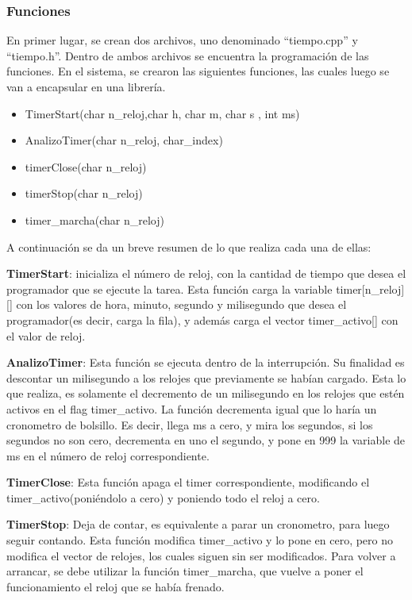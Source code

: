 \subsubsection{Funciones}

En primer lugar, se crean dos archivos, uno denominado ``tiempo.cpp''  y ``tiempo.h''. Dentro de ambos archivos se encuentra la programación de las funciones. En el sistema, se crearon las siguientes funciones, las cuales luego se van a encapsular en una librería.  

\begin{itemize}
\item TimerStart(char n\_reloj,char h, char m, char s , int ms)
\item AnalizoTimer(char n\_reloj, char\_index) 
\item timerClose(char n\_reloj) 
\item timerStop(char n\_reloj)
\item timer\_marcha(char n\_reloj) 
\end{itemize}

A continuación se da un breve resumen de lo que realiza cada una de ellas: 

\textbf{TimerStart}:  inicializa el número de reloj, con la cantidad de tiempo que desea el programador que se ejecute la tarea. Esta función carga la variable timer[n\_reloj][] con los valores de hora, minuto, segundo y milisegundo que desea el programador(es decir, carga la fila), y además carga el vector timer\_activo[] con el valor de reloj. 

\textbf{AnalizoTimer}: Esta función se ejecuta dentro de la interrupción. Su finalidad es descontar un milisegundo a los relojes que previamente se habían cargado. Esta lo que realiza, es solamente el decremento de un milisegundo en los relojes que estén activos en el flag timer\_activo. La función decrementa igual que lo haría un cronometro de bolsillo. Es decir, llega ms a cero, y mira los segundos, si los segundos no son cero, decrementa en uno el segundo, y pone en 999 la variable de ms en el número de reloj correspondiente.  

\textbf{TimerClose}: Esta función apaga el timer correspondiente, modificando el timer\_activo(poniéndolo a cero) y poniendo todo el reloj a cero. 

\textbf{TimerStop}: Deja de contar, es equivalente a parar un cronometro, para luego seguir contando. Esta función modifica timer\_activo y lo pone en cero, pero no modifica el vector de relojes, los cuales siguen sin ser modificados. Para volver a arrancar, se debe utilizar la función timer\_marcha, que vuelve a poner el funcionamiento el reloj que se había frenado. 


